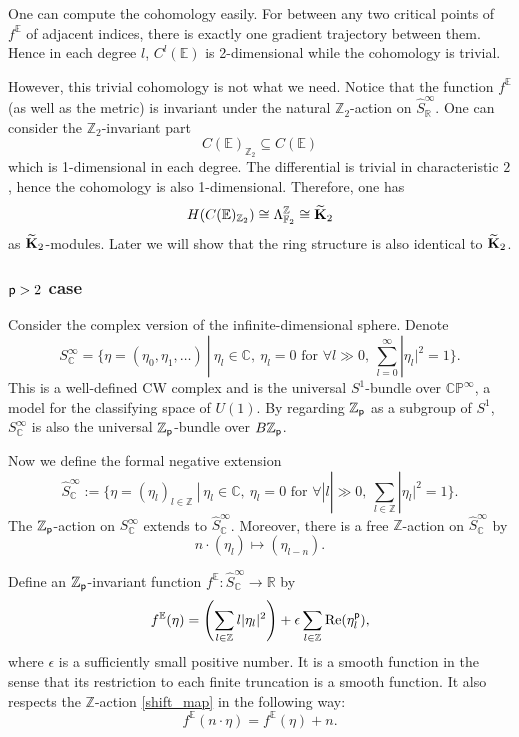 \documentclass[reqno, 10pt]{amsart}
\numberwithin{equation}{section}
\numberwithin{equation}{section}
\renewcommand{\subset}{\subseteq}
\theoremstyle{definition}
\theoremstyle{remark}
\newcommand{\beq}{\begin{equation}}
\newcommand{\eeq}{\end{equation}}
\newcommand{\beqn}{\begin{equation*}}
\newcommand{\eeqn}{\end{equation*}}
\newcommand{\mb}{\mathbb}
\newcommand{\p}{{\sf p}}
\newcommand{\zp}{{{\mb Z}_{\sf p}}}
\newcommand{\wt}{\widetilde}
\newcommand{\wh}{\widehat}
\begin{document}
One can compute the cohomology easily. For between any two critical points of $f^{\mb E}$ of adjacent indices, there is exactly one gradient trajectory between them. Hence in each degree $l$, $C^l({\mb E})$ is 2-dimensional while the cohomology is trivial. 

However, this trivial cohomology is not what we need. Notice that the function $f^{\mb E}$ (as well as the metric) is invariant under the natural ${\mb Z}_2$-action on $\wh{S}_{\mb R}^\infty$. One can consider the ${\mb Z}_2$-invariant part 
\beqn
C({\mb E})_{{\mb Z}_2} \subset C({\mb E})
\eeqn
which is 1-dimensional in each degree. The differential is trivial in characteristic $2$, hence the cohomology is also 1-dimensional. Therefore, one has 
\beqn
H ( C({\mb E})_{{\mb Z}_2}) \cong \Lambda_{{\mb F}_2}^{{\mb Z}} \cong \wt{\bf K}_2
\eeqn
as $\wt{\bf K}_2$-modules. Later we will show that the ring structure is also identical to $\wt{\bf K}_2$.

\subsubsection{$\p > 2$ case}


Consider the complex version of the infinite-dimensional sphere. Denote
\beqn
S_{\mb C}^\infty = \Big\{ \eta =  (\eta_0, \eta_1, \ldots)\ |\  \eta_l \in {\mb C},\ \eta_l = 0 \text{ for } \forall l \gg 0,\ \sum_{l=0}^\infty |\eta_l|^2 = 1 \Big\}.
\eeqn
This is a well-defined CW complex and is the universal $S^1$-bundle over $\mb{CP}^\infty$, a  model for the classifying space of $U(1)$. By regarding $\zp$ as a subgroup of $S^1$, $S_{\mb C}^\infty$ is also the universal $\zp$-bundle over $B\zp$. 

Now we define the formal negative extension
\beqn
\wh S_{\mb C}^\infty:= \Big\{ \eta = (\eta_l)_{l \in {\mb Z}}\ |\ \eta_l \in {\mb C},\ \eta_l = 0 \text{ for } \forall |l| \gg 0,\ \sum_{l \in {\mb Z}} |\eta_l|^2 = 1 \Big\}.
\eeqn
The $\zp$-action on $S_{\mb C}^\infty$ extends to $\wh S_{\mb C}^\infty$. Moreover, there is a free ${\mb Z}$-action on $\wh S_{\mb C}^\infty$ by
\beq\label{shift_map}
n\cdot (\eta_l) \mapsto (\eta_{l-n}).
\eeq

Define an $\zp$-invariant function $f^{{\mb E}}: \wh S_{\mb C}^\infty \to {\mb R}$ by 
\beq\label{fep}
f^{{\mb E}} (\eta) =  \left(  \sum_{l \in {\mb Z}} l |\eta_l|^2 \right) + \epsilon \sum_{ l \in {\mb Z}} {\rm Re}(\eta_l^{\p} ),
\eeq
where $\epsilon$ is a sufficiently small positive number. It is a smooth function in the sense that its restriction to each finite truncation is a smooth function. It also respects the ${\mb Z}$-action \eqref{shift_map} in the following way:
\beqn
f^{{\mb E}} (n \cdot \eta) = f^{{\mb E}} (\eta) + n.
\eeqn
\end{document}
